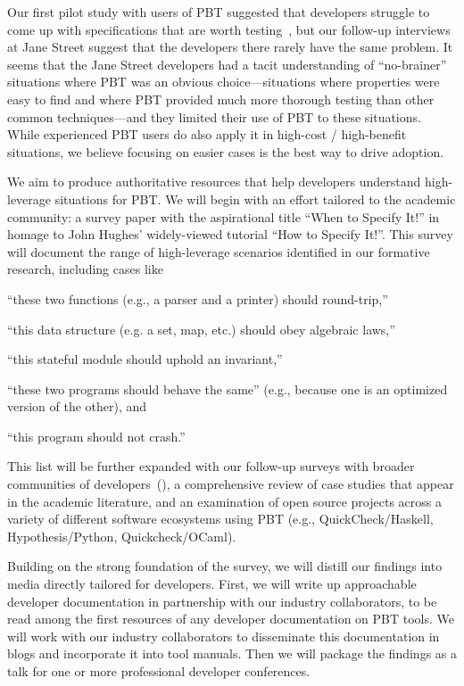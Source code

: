 %
Our first pilot study with users of PBT suggested that developers struggle to
come up with specifications that are worth
testing~\cite{goldstein_problems_2022},
but
our follow-up interviews at Jane Street suggest that the developers there
rarely have the same problem. It seems that the Jane Street developers had
a tacit
understanding of ``no-brainer'' situations where PBT was an obvious
choice---situations where properties were easy to find and where PBT provided
much more thorough testing than other common techniques---and they limited their
use of PBT to these situations.
While experienced PBT users do also apply it in
high-cost / high-benefit situations, we believe
focusing on easier cases is the best way to drive adoption.

We aim to produce authoritative resources that help developers understand
high-leverage situations for PBT. We will begin with an effort
tailored to the academic community: a survey paper with the
aspirational title ``When to Specify It!'' in homage to John Hughes'
widely-viewed tutorial ``How to Specify It!''. This survey will
document the range of high-leverage scenarios identified in our formative
research, including cases like
\begin{enumerate*}[label=(\arabic{enumi})]
\item ``these two functions (e.g., a parser and a printer) should round-trip,''
\item ``this data structure (e.g. a set, map, etc.) should obey algebraic laws,''
\item ``this stateful module should uphold an invariant,''
\item ``these two programs should behave the same'' (e.g., because one
is an optimized version of the other),
and
\item ``this program should not crash.''
\end{enumerate*}
This list will be further expanded with our follow-up surveys with broader
communities of developers~(), a comprehensive
review of case studies that appear in
the academic literature, and an examination of open source projects across a
variety of different software ecosystems using PBT (e.g.,
QuickCheck/Haskell, Hypothesis/Python, Quickcheck/OCaml).

Building on the strong foundation of the survey, we will distill our findings
into media directly tailored for developers. First, we will write up
approachable developer documentation in partnership with our industry
collaborators, to be read among the first resources of any developer
documentation on PBT tools. We will work with our industry collaborators to
disseminate this documentation in blogs and incorporate it into tool
manuals. Then we will package the findings as a talk for one or more
professional developer conferences.

